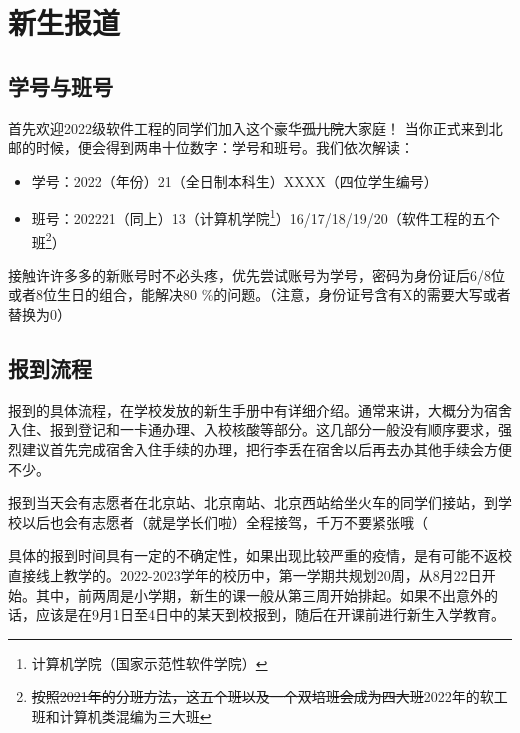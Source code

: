\section{新生报道}

\subsection{学号与班号}

首先欢迎2022级软件工程的同学们加入这个豪华\sout{孤儿院}大家庭！
当你正式来到北邮的时候，便会得到两串十位数字：学号和班号。我们依次解读：
\begin{itemize}
    \itshape
    \item 学号：2022（年份）21（全日制本科生）XXXX（四位学生编号）
    \item 班号：202221（同上）13（计算机学院\footnote{计算机学院（国家示范性软件学院）}）16/17/18/19/20（软件工程的五个班\footnote{\sout{按照2021年的分班方法，这五个班以及一个双培班会成为四大班}2022年的软工班和计算机类混编为三大班}）
\end{itemize}

接触许许多多的新账号时不必头疼，优先尝试账号为学号，密码为身份证后6/8位或者8位生日的组合，能解决80 \%的问题。（注意，身份证号含有X的需要大写或者替换为0）

\subsection{报到流程}

报到的具体流程，在学校发放的新生手册中有详细介绍。通常来讲，大概分为宿舍入住、报到登记和一卡通办理、入校核酸等部分。这几部分一般没有顺序要求，强烈建议首先完成宿舍入住手续的办理，把行李丢在宿舍以后再去办其他手续会方便不少。

报到当天会有志愿者在北京站、北京南站、北京西站给坐火车的同学们接站，到学校以后也会有志愿者（就是学长们啦）全程接驾，千万不要紧张哦（


具体的报到时间具有一定的不确定性，如果出现比较严重的疫情，是有可能不返校直接线上教学的。2022-2023学年的校历中，第一学期共规划20周，从8月22日开始。其中，前两周是小学期，新生的课一般从第三周开始排起。如果不出意外的话，应该是在9月1日至4日中的某天到校报到，随后在开课前进行新生入学教育。
